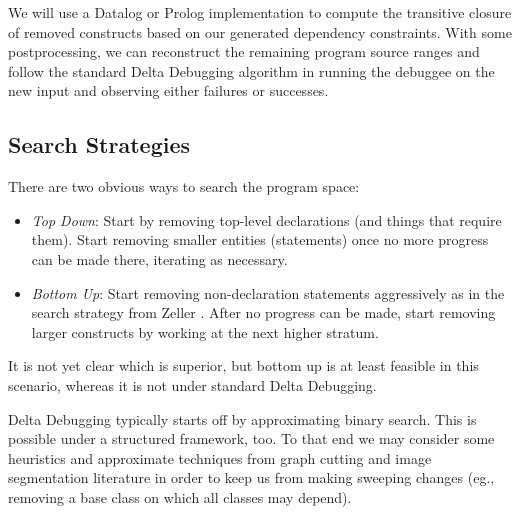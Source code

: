 \documentclass[11pt]{article}
\begin{document}
\begin{itemize}
  We will use a Datalog or Prolog implementation to compute the transitive
  closure of removed constructs based on our generated dependency constraints.
  With some postprocessing, we can reconstruct the remaining program source
  ranges and follow the standard Delta Debugging algorithm in running the
  debuggee on the new input and observing either failures or successes.

\subsection{Search Strategies}
There are two obvious ways to search the program space:
\begin{itemize}
\item \emph{Top Down}: Start by removing top-level declarations (and things that
  require them). Start removing smaller entities (statements) once no more
  progress can be made there, iterating as necessary.
\item \emph{Bottom Up}: Start removing non-declaration statements aggressively
  as in the search strategy from Zeller \cite{dd}. After no progress can be
  made, start removing larger constructs by working at the next higher stratum.
\end{itemize}
It is not yet clear which is superior, but bottom up is at least feasible in
this scenario, whereas it is not under standard Delta Debugging.

Delta Debugging typically starts off by approximating binary search. This is
possible under a structured framework, too. To that end we may consider some
heuristics and approximate techniques from graph cutting and image segmentation
literature \cite{nc} in order to keep us from making sweeping changes (eg.,
removing a base class on which all classes may depend).


\end{itemize}
\end{document}
